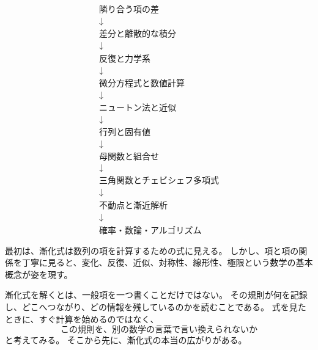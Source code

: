 \[
\begin{array}{c}
\text{隣り合う項の差} \\
\downarrow \\
\text{差分と離散的な積分} \\
\downarrow \\
\text{反復と力学系} \\
\downarrow \\
\text{微分方程式と数値計算} \\
\downarrow \\
\text{ニュートン法と近似} \\
\downarrow \\
\text{行列と固有値} \\
\downarrow \\
\text{母関数と組合せ} \\
\downarrow \\
\text{三角関数とチェビシェフ多項式} \\
\downarrow \\
\text{不動点と漸近解析} \\
\downarrow \\
\text{確率・数論・アルゴリズム}
\end{array}
\]

最初は、漸化式は数列の項を計算するための式に見える。
しかし、項と項の関係を丁寧に見ると、変化、反復、近似、対称性、線形性、極限という数学の基本概念が姿を現す。

漸化式を解くとは、一般項を一つ書くことだけではない。
その規則が何を記録し、どこへつながり、どの情報を残しているのかを読むことである。
式を見たときに、すぐ計算を始めるのではなく、
\[
  \text{この規則を、別の数学の言葉で言い換えられないか}
\]
と考えてみる。
そこから先に、漸化式の本当の広がりがある。
